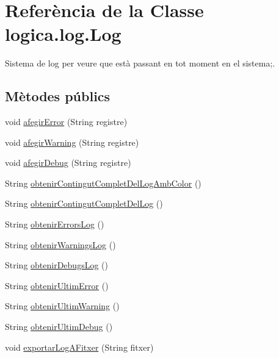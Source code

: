 \hypertarget{classlogica_1_1log_1_1_log}{\section{Referència de la Classe logica.\+log.\+Log}
\label{classlogica_1_1log_1_1_log}
}


Sistema de log per veure que està passant en tot moment en el sistema;.  


\subsection*{Mètodes públics}
\begin{DoxyCompactItemize}
\item 
void \hyperlink{classlogica_1_1log_1_1_log_abdcf225ffc06e746b5d224c060b01f98}{afegir\+Error} (String registre)
\item 
void \hyperlink{classlogica_1_1log_1_1_log_af5a685966d6e6ef00d93c879b4f3154a}{afegir\+Warning} (String registre)
\item 
void \hyperlink{classlogica_1_1log_1_1_log_a22b7784b896630f85cd9791d02d13d70}{afegir\+Debug} (String registre)
\item 
String \hyperlink{classlogica_1_1log_1_1_log_a4f1a4853972d056a0da55189e4ebf4da}{obtenir\+Contingut\+Complet\+Del\+Log\+Amb\+Color} ()
\item 
String \hyperlink{classlogica_1_1log_1_1_log_a1902dfacc9adf60b63a801c7d32c4dcf}{obtenir\+Contingut\+Complet\+Del\+Log} ()
\item 
String \hyperlink{classlogica_1_1log_1_1_log_adbe0cf7e75ae815279d2e88cf110e29b}{obtenir\+Errors\+Log} ()
\item 
String \hyperlink{classlogica_1_1log_1_1_log_ad7447bfb49c4ec37d1a740a3d5750c63}{obtenir\+Warnings\+Log} ()
\item 
String \hyperlink{classlogica_1_1log_1_1_log_a8a577eb2906568f3501667482d80dfc0}{obtenir\+Debugs\+Log} ()
\item 
String \hyperlink{classlogica_1_1log_1_1_log_a7d2d9d5951e933a735d4700d2d52c8ac}{obtenir\+Ultim\+Error} ()
\item 
String \hyperlink{classlogica_1_1log_1_1_log_a06dd49f9ab88537f9f0c7a66749c2f7c}{obtenir\+Ultim\+Warning} ()
\item 
String \hyperlink{classlogica_1_1log_1_1_log_a19589f17f8be0527f89145d59ee64081}{obtenir\+Ultim\+Debug} ()
\item 
void \hyperlink{classlogica_1_1log_1_1_log_a9f9c696aee364b77288dffc4d6d57e8b}{exportar\+Log\+A\+Fitxer} (String fitxer)
\end{DoxyCompactItemize}
